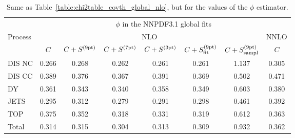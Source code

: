 \begin{table}[t]
\begin{center}
\renewcommand*{\arraystretch}{1.78}
\footnotesize
\begin{tabular}{|l|c|ccc|cc|c|}
  \toprule
  & \multicolumn{7}{c|}{$\phi$ in the NNPDF3.1 global fits}   \\
 Process & \multicolumn{6}{c|}{NLO}  & NNLO  \\
 & $C$ & $C+S^{(\rm 9pt)}$   &  $C+S^{(\rm 7pt)}$  &  $C+S^{(\rm 3pt)}$ & $C+S^{(\rm 9pt)}_{\rm fit}$ &
  $C+S^{(\rm 9pt)}_{\rm sampl}$   &  $C$ \\
\toprule
DIS NC    & 0.266  & 0.268   & 0.262 & 0.261 & 0.261 & 1.137 & 0.305 \\
DIS CC    & 0.389  & 0.376   & 0.367 & 0.391 & 0.369 & 0.502 & 0.471 \\
\midrule  
DY        & 0.361  & 0.343   & 0.340 & 0.358 & 0.349 & 0.603 & 0.380 \\
JETS      & 0.295  & 0.312   & 0.279 & 0.291 & 0.298 & 0.461 & 0.392 \\
TOP       & 0.375  & 0.352   & 0.318 & 0.331 & 0.319 & 0.612 & 0.363 \\
\midrule
Total     & 0.314  & 0.315   & 0.304 & 0.313 & 0.309 & 0.932 & 0.362 \\
\bottomrule
\end{tabular}
\end{center}
\caption{Same as Table~\ref{table:chi2table_covth_global_nlo}, but 
  for the values of the $\phi$ estimator.
  \label{table:phitable_covth_global_nlo}
}
  \end{table}
